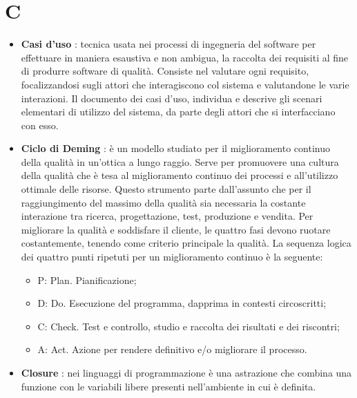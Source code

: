 % 
%
% 
%

\section{C}

\begin{itemize}
	\item \textbf{Casi d'uso} : tecnica usata nei processi di ingegneria del software per effettuare in maniera esaustiva e non ambigua, la raccolta dei requisiti al fine di produrre software di qualità. Consiste nel valutare ogni requisito, focalizzandosi sugli attori che interagiscono col sistema e valutandone le varie interazioni. Il documento dei casi d’uso, individua e descrive gli scenari elementari di utilizzo del sistema, da parte degli attori che si interfacciano con esso.

	\item \textbf{Ciclo di Deming} : è un modello studiato per il miglioramento continuo della qualità in un’ottica a lungo raggio. Serve per promuovere una cultura della qualità che è tesa al miglioramento continuo dei processi e all’utilizzo ottimale delle risorse. Questo strumento parte dall’assunto che per il raggiungimento del massimo della qualità sia necessaria la costante interazione tra ricerca, progettazione, test, produzione e vendita.
Per migliorare la qualità e soddisfare il cliente, le quattro fasi devono ruotare costantemente, tenendo come criterio principale la qualità.
La sequenza logica dei quattro punti ripetuti per un miglioramento continuo è la seguente:
	\begin{itemize}
		\item P: Plan. Pianificazione;
		\item D: Do. Esecuzione del programma, dapprima in contesti circoscritti;
		\item C: Check. Test e controllo, studio e raccolta dei risultati e dei riscontri;
		\item A: Act. Azione per rendere definitivo e/o migliorare il processo.
	\end{itemize}

	\item \textbf{Closure} : nei linguaggi di programmazione è una astrazione che combina una funzione con le variabili libere presenti nell'ambiente in cui è definita. \\


\end{itemize}
